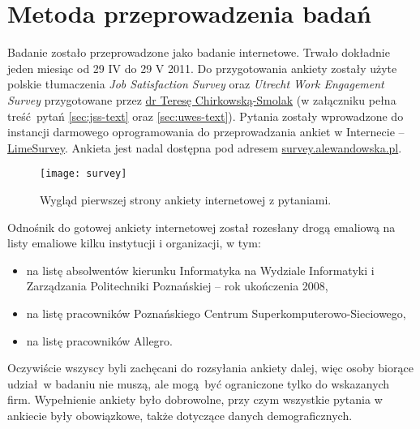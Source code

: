 \section{Metoda przeprowadzenia badań}
Badanie zostało przeprowadzone jako badanie internetowe. Trwało dokładnie jeden miesiąc od 29 IV do 29 V 2011. Do przygotowania ankiety zostały użyte polskie tłumaczenia \emph{Job Satisfaction Survey} oraz \emph{Utrecht Work Engagement Survey} przygotowane przez \href{http://www.psychologia.amu.edu.pl/ip-uam/struktura-zatrudnienia-w-instytucie/curriculum-vitae-teresa-chirkowska-smolak/}{dr Teresę Chirkowską-Smolak} (w załączniku pełna treść pytań \ref{sec:jss-text} oraz \ref{sec:uwes-text}). Pytania zostały wprowadzone do instancji darmowego oprogramowania do przeprowadzania ankiet
w Internecie -- \href{http://www.limesurvey.org/}{LimeSurvey}. Ankieta jest nadal dostępna pod
adresem \url{survey.alewandowska.pl}.

\begin{figure}[h]
\begin{center}
\texttt{[image: survey]}
\end{center}
\caption{Wygląd pierwszej strony ankiety internetowej z pytaniami.}
\label{fig:sex}
\end{figure}

Odnośnik do gotowej ankiety internetowej został rozesłany drogą emaliową na listy emaliowe kilku instytucji i organizacji, w tym:
\begin{itemize}
\item na listę absolwentów kierunku Informatyka na Wydziale Informatyki i Zarządzania Politechniki Poznańskiej -- rok ukończenia 2008,
\item na listę pracowników Poznańskiego Centrum Superkomputerowo-Sieciowego,
\item na listę pracowników Allegro.
\end{itemize}
Oczywiście wszyscy byli zachęcani do rozsyłania ankiety dalej, więc osoby biorące udział w badaniu nie muszą, ale mogą być ograniczone tylko do wskazanych firm. Wypełnienie ankiety było dobrowolne, przy czym wszystkie pytania w ankiecie były obowiązkowe, także dotyczące danych demograficznych.
